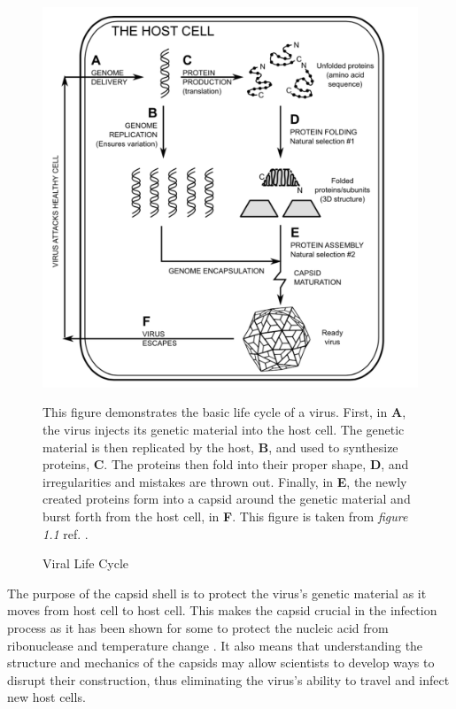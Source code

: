 \documentclass[12pt,letter]{article}
\begin{document}
\begin{figure}[t!]
	\caption{Viral Life Cycle}
	\centering
	\includegraphics[width = .6\textwidth]{life_cycle.pdf}
	\begin{minipage}[h]{.85\textwidth}
		\begin{footnotesize}
			This figure demonstrates the basic life cycle of a virus. First, in \textbf{A}, the virus injects its genetic material into the host cell. The genetic material is then replicated by the host, \textbf{B}, and used to synthesize proteins, \textbf{C}. The proteins then fold into their proper shape, \textbf{D}, and irregularities and mistakes are thrown out. Finally, in \textbf{E}, the newly created proteins form into a capsid around the genetic material and burst forth from the host cell, in \textbf{F}. This figure is taken from \textit{figure 1.1} ref. \cite{Mannige:Thesis}.
		\end{footnotesize}
	\end{minipage}
	\label{fig:life_cycle}
\end{figure}
	
The purpose of the capsid shell is to protect the virus's genetic material as it moves from host cell to host cell. This makes the capsid crucial in the infection process as it has been shown for some to protect the nucleic acid from ribonuclease and temperature change \cite[p 5]{Caspar:1962}. It also means that understanding the structure and mechanics of the capsids may allow scientists to develop ways to disrupt their construction, thus eliminating the virus's ability to travel and infect new host cells. 
\end{document}
